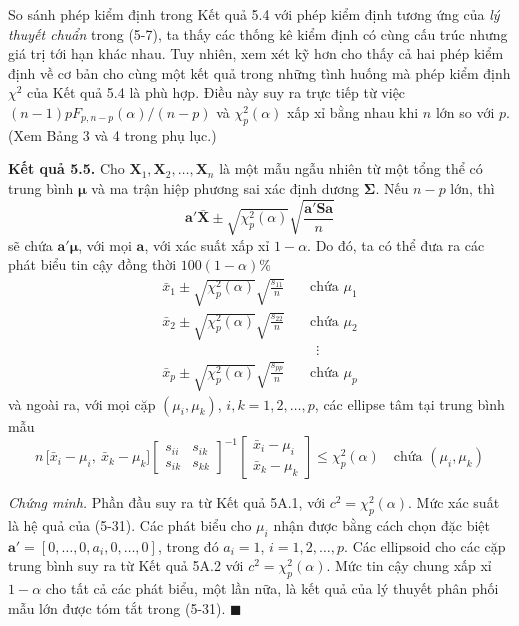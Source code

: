 \medskip
So sánh phép kiểm định trong Kết quả 5.4 với phép kiểm định tương ứng của \emph{lý thuyết chuẩn} trong (5-7), ta thấy các thống kê kiểm định có cùng cấu trúc nhưng giá trị tới hạn khác nhau. Tuy nhiên, xem xét kỹ hơn cho thấy cả hai phép kiểm định về cơ bản cho cùng một kết quả trong những tình huống mà phép kiểm định $\chi^2$ của Kết quả 5.4 là phù hợp. Điều này suy ra trực tiếp từ việc $(n-1)pF_{p,n-p}(\alpha)/(n-p)$ và $\chi_p^2(\alpha)$ xấp xỉ bằng nhau khi $n$ lớn so với $p$. (Xem Bảng 3 và 4 trong phụ lục.)

\medskip
\noindent\textbf{Kết quả 5.5.} Cho $\mathbf{X}_1, \mathbf{X}_2, \dots, \mathbf{X}_n$ là một mẫu ngẫu nhiên từ một tổng thể có trung bình $\boldsymbol{\mu}$ và ma trận hiệp phương sai xác định dương $\boldsymbol{\Sigma}$. Nếu $n-p$ lớn, thì
\[
    \mathbf{a}'\bar{\mathbf{X}} \pm \sqrt{\chi_p^2(\alpha)}\sqrt{\frac{\mathbf{a}'\mathbf{S}\mathbf{a}}{n}}
\]
sẽ chứa $\mathbf{a}'\boldsymbol{\mu}$, với mọi $\mathbf{a}$, với xác suất xấp xỉ $1-\alpha$. Do đó, ta có thể đưa ra các phát biểu tin cậy đồng thời $100(1-\alpha)\%$
\begin{align*}
    \bar{x}_1 \pm \sqrt{\chi_p^2(\alpha)}\sqrt{\frac{s_{11}}{n}} \quad &\text{chứa } \mu_1 \\
    \bar{x}_2 \pm \sqrt{\chi_p^2(\alpha)}\sqrt{\frac{s_{22}}{n}} \quad &\text{chứa } \mu_2 \\
    &\ \ \vdots \\
    \bar{x}_p \pm \sqrt{\chi_p^2(\alpha)}\sqrt{\frac{s_{pp}}{n}} \quad &\text{chứa } \mu_p
\end{align*}
và ngoài ra, với mọi cặp $(\mu_i, \mu_k)$, $i,k=1,2,\dots,p$, các ellipse tâm tại trung bình mẫu
\[
    n\,\bigl[\bar{x}_i-\mu_i,\ \bar{x}_k-\mu_k\bigr]
    \begin{bmatrix} s_{ii} & s_{ik} \\ s_{ik} & s_{kk} \end{bmatrix}^{-1}
    \begin{bmatrix}\bar{x}_i-\mu_i \\ \bar{x}_k-\mu_k\end{bmatrix}
    \le \chi_p^2(\alpha) \quad \text{chứa } (\mu_i, \mu_k)
\]

\medskip
\noindent\textit{Chứng minh.} Phần đầu suy ra từ Kết quả 5A.1, với $c^2=\chi_p^2(\alpha)$. Mức xác suất là hệ quả của (5-31). Các phát biểu cho $\mu_i$ nhận được bằng cách chọn đặc biệt $\mathbf{a}'=[0,\dots,0,a_i,0,\dots,0]$, trong đó $a_i=1$, $i=1,2,\dots,p$. Các ellipsoid cho các cặp trung bình suy ra từ Kết quả 5A.2 với $c^2=\chi_p^2(\alpha)$. Mức tin cậy chung xấp xỉ $1-\alpha$ cho tất cả các phát biểu, một lần nữa, là kết quả của lý thuyết phân phối mẫu lớn được tóm tắt trong (5-31). \hfill$\blacksquare$

